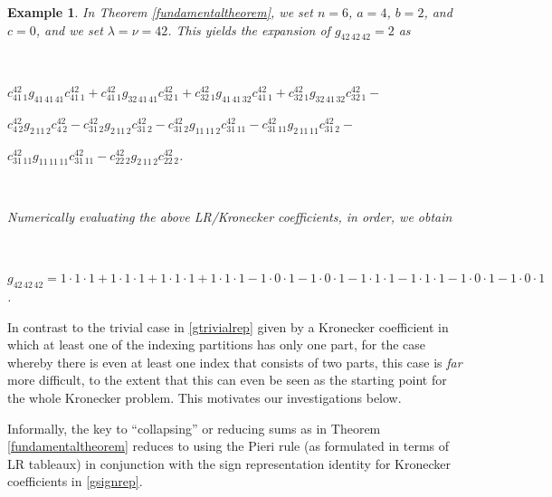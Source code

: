 \documentclass[12pt]{article}
\newtheorem{example}{Example}
\begin{document}
\begin{example}
 In Theorem \ref{fundamentaltheorem}, we set $n = 6$, $a = 4$, $b = 2$, and $c = 0$, and we set $\lambda = \nu = 42$. This yields
 the expansion of $g_{42 \, 42 \, 42} = 2$ as 

 \ 

\noindent $ c_{41 \, 1}^{42} g_{41 \, 41 \, 41} c_{41 \, 1}^{42} + c_{41 \, 1}^{42} g_{32 \, 41 \, 41} c_{32 \, 1}^{42} + c_{32 \, 1}^{42}
 g_{41 \, 41 \, 32} c_{41 \, 1}^{42} + c_{32 \, 1}^{42} g_{32 \, 41 \, 32} c_{32 \, 1}^{42} - $

\noindent $ c_{4 \, 2}^{42} g_{2 \, 11 \, 2} c_{4 \, 2}^{42} - c_{31 \, 2}^{42} g_{2 \, 11 \, 2} c_{31 \, 2}^{42} - 
 c_{31 \, 2}^{42} g_{11 \, 11 \, 2} c_{31 \, 11}^{42} - c_{31 \, 11}^{42} g_{2 \, 11 \, 11} c_{31 \, 2}^{42} - $ 
 
\noindent $ c_{31 \, 11}^{42} g_{11 \, 11 \, 11} c_{31 \, 11}^{42} - c_{22 \, 2}^{42} g_{2 \, 11 \, 2} c_{22 \, 2}^{42}$. 

 \ 

\noindent Numerically evaluating the above LR/Kronecker coefficients, in order, we obtain 

 \ 

\noindent $ g_{42 \, 42 \, 42} = 1 \cdot 1 \cdot 1 + 1 \cdot 1 \cdot 1 + 1 \cdot 1 \cdot 1 + 1 \cdot 1 \cdot 1 - 1 \cdot 0 \cdot 1 - 
 1 \cdot 0 \cdot 1 - 
 1 \cdot 1 \cdot 1 - 1 \cdot 1 \cdot 1 - 1 \cdot 0 \cdot 1 - 1 \cdot 0 \cdot 1$. 
\end{example}

 In contrast to the trivial case in \eqref{gtrivialrep} given by a Kronecker coefficient in which at least one of the indexing partitions has only 
 one part, for the case whereby there is even at least one index that consists of two parts, this case is \emph{far} more difficult, to the 
 extent that this can even be seen as the starting point for the whole Kronecker problem. This motivates our investigations below. 

 Informally, the key to ``collapsing'' or reducing sums as in Theorem \ref{fundamentaltheorem} reduces to using the Pieri rule (as 
 formulated in terms of LR tableaux) in conjunction with the sign representation identity for Kronecker coefficients in \eqref{gsignrep}. 
\end{document}
